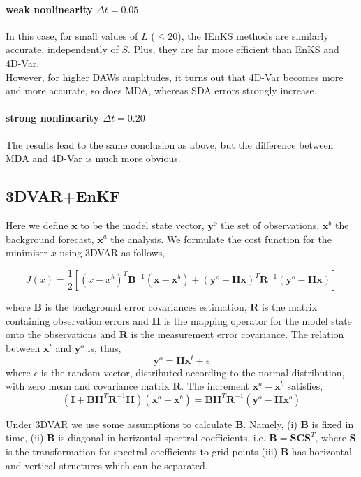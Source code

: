 \documentclass[a4,12pt]{article}
\numberwithin{equation}{section}
\begin{document}
\paragraph{weak nonlinearity $\Delta t = 0.05$}
In this case, for small values of $L$ ($\leq 20$), the IEnKS methods are similarly accurate, independently of $S$. Plus, they are far more efficient than EnKS and 4D-Var. \\
However, for higher DAWs amplitudes, it turns out that 4D-Var becomes more and more accurate, so does MDA, whereas SDA errors strongly increase.

\paragraph{strong nonlinearity $\Delta t = 0.20$}
The results lead to the same conclusion as above, but the difference between MDA and 4D-Var is much more obvious.

\subsection{3DVAR+EnKF}
Here we define $\textbf{x}$ to be the model state vector, $\textbf{y}^{o}$ the set of observations, $\textbf{x}^{b}$ the background forecast, $\textbf{x}^{a}$ the analysis. We formulate the cost function for the minimiser $x$ using 3DVAR as follows,

$$J(x) = \frac{1}{2}[(x-x^{b})^{T}\textbf{B}^{-1}(\textbf{x}-\textbf{x}^{b})+(\textbf{y}^{o}-\textbf{H}\textbf{x})^{T}\textbf{R}^{-1}(\textbf{y}^{o}-\textbf{Hx})]$$

where $\textbf{B}$ is the background error covariances estimation, $\textbf{R}$ is the matrix containing observation errors and $\textbf{H}$ is the mapping operator for the model state onto the observations and  $\textbf{R}$ is the measurement error covariance. The relation between $\textbf{x}^{t}$ and $\textbf{y}^{o}$ is, thus, $$\textbf{y}^{o} = \textbf{H}\textbf{x}^{t} + \epsilon$$ where $\epsilon$ is the random vector, distributed according to the normal distribution, with zero mean and covariance matrix $\textbf{R}$. The increment $\textbf{x}^{a} - \textbf{x}^{b}$ satisfies, 
$$(\textbf{I} + \textbf{BH}^{T}\textbf{R}^{-1}\textbf{H})(\textbf{x}^{a}-\textbf{x}^{b}) = \textbf{B}\textbf{H}^{T}\textbf{R}^{-1}(\textbf{y}^{o}-\textbf{H}\textbf{x}^{b})$$   

Under 3DVAR we use some assumptions to calculate $\textbf{B}$. Namely, (i) $\textbf{B}$ is fixed in time, (ii) $\textbf{B}$ is diagonal in horizontal spectral coefficients, i.e. $\textbf{B} = \textbf{S}\textbf{C}\textbf{S}^{T}$, where $\textbf{S}$ is the transformation for spectral coefficients to grid points (iii) $\textbf{B}$ has horizontal and vertical structures which can be separated. 
\end{document}
